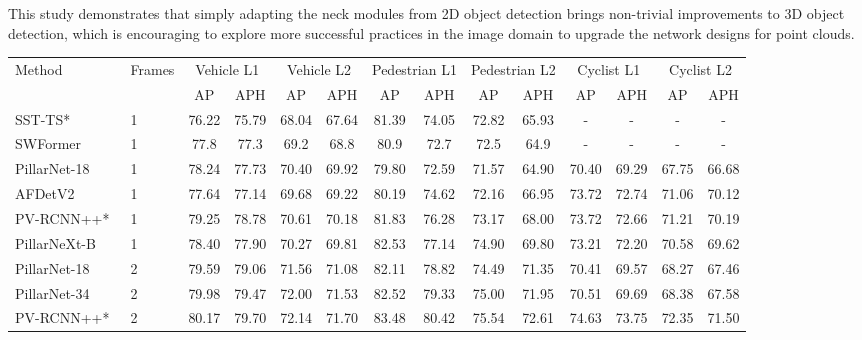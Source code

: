 \documentclass[10pt,twocolumn,letterpaper]{article}
\begin{document}
This study demonstrates that simply adapting the neck modules from 2D object detection brings non-trivial improvements to 3D object detection, which is encouraging to explore more successful practices in the image domain to upgrade the network designs for point clouds.   




\begin{table*}[]
\centering
\setlength{\tabcolsep}{4pt}
\begin{tabular}{l|l|cc|cc|cc|cc|cc|cc}
\hline
\multirow{2}{*}{Method} & \multirow{2}{*}{Frames} & \multicolumn{2}{c|}{Vehicle L1} & \multicolumn{2}{c|}{Vehicle L2} & \multicolumn{2}{c|}{Pedestrian L1} & \multicolumn{2}{c|}{Pedestrian L2} & \multicolumn{2}{c|}{Cyclist L1} & \multicolumn{2}{c}{Cyclist L2} \\  
                        &                         & AP            & APH           & AP            & APH           & AP           & APH         & AP           & APH         & AP           & APH         & AP           & APH         \\ \hline
SST-TS*~\cite{fan2022embracing} & 1 & 76.22&  75.79 &  68.04&  67.64&   81.39&  74.05 & 72.82&  65.93  &  - &  - & - & - \\
SWFormer~\cite{sun2022swformer} & 1 & 77.8 & 77.3  & 69.2 & 68.8  &  80.9 &  72.7  &  72.5 &  64.9  &  - &  - & - & - \\
PillarNet-18~\cite{shi2022pillarnet}   &  1    &    78.24 &  77.73  & 70.40 &  69.92  & 79.80  & 72.59  & 71.57  & 64.90  & 70.40  & 69.29 &  67.75  & 66.68       \\ 
AFDetV2~\cite{hu2022afdetv2} &  1   &  77.64  &   77.14  & 69.68  & 69.22 &80.19 & 74.62 & 72.16 & 66.95 & 73.72& 72.74 &71.06 & 70.12 \\ 
PV-RCNN++*~\cite{shi2021pv} & 1 & 79.25 & 78.78 & 70.61&  70.18 & 81.83 &  76.28 & 73.17 & 68.00 & 73.72 & 72.66 & 71.21 & 70.19 \\
PillarNeXt-B  &   1  &  78.40 & 77.90 & 70.27 & 69.81 & 82.53 &77.14 & 74.90 & 69.80 & 73.21 & 72.20 & 70.58 & 69.62 \\  \hline
PillarNet-18~\cite{shi2022pillarnet}  &  2 &  79.59  &  79.06  & 71.56 &   71.08 &  82.11 &  78.82  & 74.49  & 71.35 & 70.41 &  69.57  &  68.27 & 67.46  \\
PillarNet-34~\cite{shi2022pillarnet}  & 2 & 79.98 & 79.47 & 72.00 & 71.53 & 82.52 & 79.33 & 75.00 & 71.95 & 70.51 & 69.69 & 68.38 & 67.58 \\ 
PV-RCNN++*~\cite{shi2021pv} & 2 & 80.17 & 79.70 & 72.14 & 71.70 & 83.48 & 80.42 & 75.54 & 72.61	& 74.63 & 73.75 & 72.35 & 71.50 \\ 

\end{tabular}
\end{table*}
\end{document}
